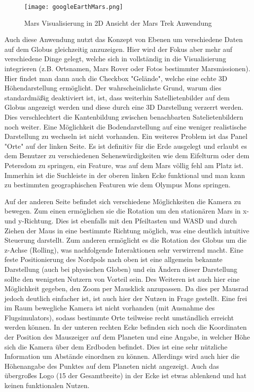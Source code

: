 \begin{figure}[H]
  \texttt{[image: googleEarthMars.png]}
  \caption{Mars Visualisierung in 2D Ansicht der Mars Trek Anwendung}
  \label{googleEarthMars}
\end{figure}

Auch diese Anwendung nutzt das Konzept von Ebenen um verschiedene Daten auf dem Globus gleichzeitig anzuzeigen. Hier wird der Fokus aber mehr auf verschiedene Dinge gelegt, welche sich in vollständig in die Visualisierung integrieren (z.B. Ortsnamen, Mars Rover oder Fotos bestimmter Marsmissionen). Hier findet man dann auch die Checkbox "Gelände", welche eine echte 3D Höhendarstellung ermöglicht. Der wahrscheinlichste Grund, warum dies standardmäßig deaktiviert ist, ist, dass weiterhin Satellietenbilder auf dem Globus angezeigt werden und diese durch eine 3D Darstellung verzerrt werden. Dies verschlechtert die Kantenbildung zwischen benachbarten Satelietenbildern noch weiter. Eine Möglichkeit die Bodendarstellung auf eine weniger realistische Darstellung zu wechseln ist nicht vorhanden. Ein weiteres Problem ist das Panel "Orte" auf der linken Seite. Es ist definitiv für die Erde ausgelegt und erlaubt es dem Benutzer zu verschiedenen Sehenswürdigkeiten wie dem Eifelturm oder dem Petersdom zu springen, ein Feature, was auf dem Mars völlig fehl am Platz ist. Immerhin ist die Suchleiste in der oberen linken Ecke funktional und man kann zu bestimmten geographischen Featuren wie dem Olympus Mons springen.

Auf der anderen Seite befindet sich verschiedene Möglichkeiten die Kamera zu bewegen. Zum einen ermöglichen sie die Rotation um den stationären Mars in x- und y-Richtung. Dies ist ebenfalls mit den Pfeiltasten und WASD und durch Ziehen der Maus in eine bestimmte Richtung möglich, was eine deutlich intuitive Steuerung darstellt. Zum anderen ermöglicht es die Rotation des Globus um die z-Achse (Rolling), was nachfolgende Interaktionen sehr verwirrend macht. Eine feste Positionierung des Nordpols nach oben ist eine allgemein bekannte Darstellung (auch bei physischen Globen) und ein Ändern dieser Darstellung sollte den wenigsten Nutzern von Vorteil sein. Des Weiteren ist auch hier eine Möglichkeit gegeben, den Zoom per Mausklick anzupassen. Da dies per Mausrad jedoch deutlich einfacher ist, ist auch hier der Nutzen in Frage gestellt. Eine frei im Raum bewegliche Kamera ist nicht vorhanden (mit Ausnahme des Flugsimulators), sodass bestimmte Orte teilweise recht umständlich erreicht werden können. In der unteren rechten Ecke befinden sich noch die Koordinaten der Position des Mauszeiger auf dem Planeten und eine Angabe, in welcher Höhe sich die Kamera über dem Erdboden befindet. Dies ist eine sehr nützliche Information um Abstände einordnen zu können. Allerdings wird auch hier die Höhenangabe des Punktes auf dem Planeten nicht angezeigt. Auch das übergroßes Logo (1\/5 der Gesamtbreite) in der Ecke ist etwas ablenkend und hat keinen funktionalen Nutzen.

